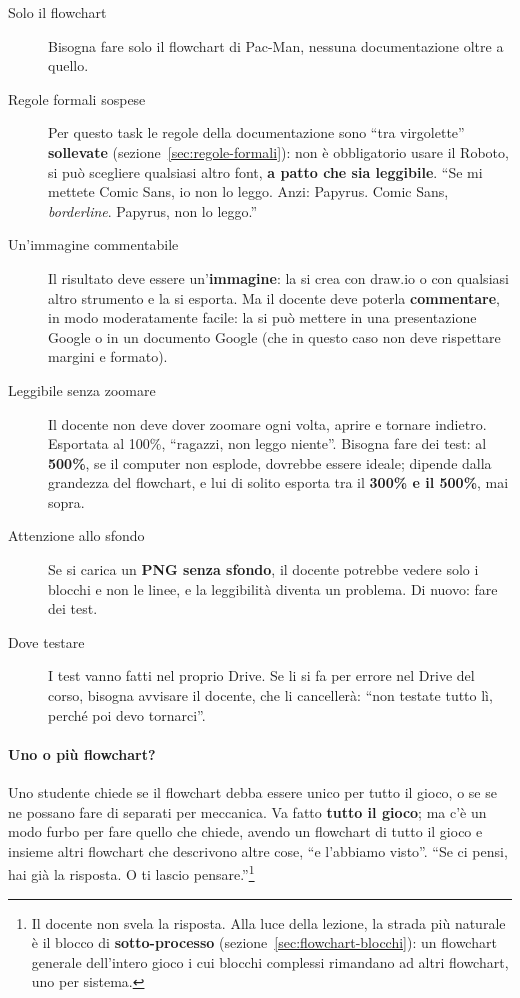 \begin{description}
  \item[Solo il flowchart] Bisogna fare solo il flowchart di Pac-Man, nessuna
        documentazione oltre a quello.
  \item[Regole formali sospese] Per questo task le regole della
        documentazione sono ``tra virgolette'' \textbf{sollevate}
        (sezione~\ref{sec:regole-formali}): non è obbligatorio usare il
        Roboto, si può scegliere qualsiasi altro font, \textbf{a patto che
        sia leggibile}. ``Se mi mettete Comic Sans, io non lo leggo.
        Anzi: Papyrus. Comic Sans, \emph{borderline}. Papyrus, non lo
        leggo.''
  \item[Un'immagine commentabile] Il risultato deve essere
        un'\textbf{immagine}: la si crea con draw.io o con qualsiasi altro
        strumento e la si esporta. Ma il docente deve poterla
        \textbf{commentare}, in modo moderatamente facile: la si può mettere
        in una presentazione Google o in un documento Google (che in questo
        caso non deve rispettare margini e formato).
  \item[Leggibile senza zoomare] Il docente non deve dover zoomare ogni
        volta, aprire e tornare indietro. Esportata al 100\%,
        ``ragazzi, non leggo niente''. Bisogna fare dei test: al
        \textbf{500\%}, se il computer non esplode, dovrebbe essere ideale;
        dipende dalla grandezza del flowchart, e lui di solito esporta tra
        il \textbf{300\% e il 500\%}, mai sopra.
  \item[Attenzione allo sfondo] Se si carica un \textbf{PNG senza sfondo},
        il docente potrebbe vedere solo i blocchi e non le linee, e la
        leggibilità diventa un problema. Di nuovo: fare dei test.
  \item[Dove testare] I test vanno fatti nel proprio Drive. Se li si fa per
        errore nel Drive del corso, bisogna avvisare il docente, che li
        cancellerà: ``non testate tutto lì, perché poi devo tornarci''.
\end{description}

\paragraph{Uno o più flowchart?} Uno studente chiede se il flowchart debba
essere unico per tutto il gioco, o se se ne possano fare di separati per
meccanica. Va fatto \textbf{tutto il gioco}; ma c'è un modo furbo per fare
quello che chiede, avendo un flowchart di tutto il gioco e insieme altri
flowchart che descrivono altre cose, ``e l'abbiamo visto''. ``Se ci pensi, hai
già la risposta. O ti lascio pensare.''\footnote{Il docente non svela la
risposta. Alla luce della lezione, la strada più naturale è il blocco di
\textbf{sotto-processo} (sezione~\ref{sec:flowchart-blocchi}): un flowchart
generale dell'intero gioco i cui blocchi complessi rimandano ad altri
flowchart, uno per sistema.}

